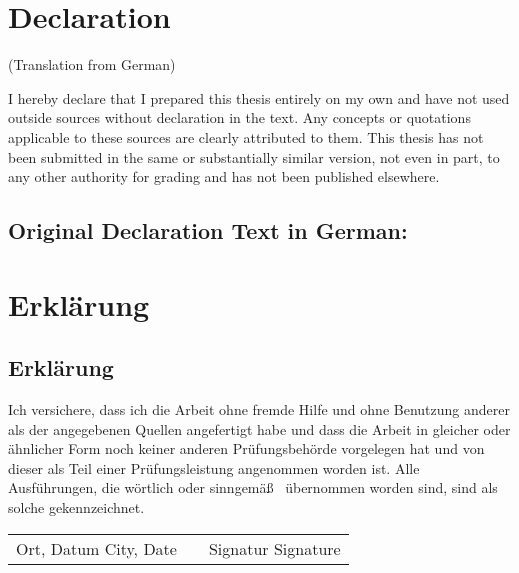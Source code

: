 	
	\ifgerman\else
	\chapter*{Declaration}\vspace{-24pt}
	
	(Translation from German)\bigskip
	
	\noindent I hereby declare that I prepared this thesis entirely on my own and have not used outside sources
	without declaration in the text. Any concepts or quotations applicable to these sources are
	clearly attributed to them. This thesis has not been submitted in the same or substantially similar
	version, not even in part, to any other authority for grading and has not been published elsewhere.

	\section*{Original Declaration Text in German:}

	\fi
	\ifgerman
	\chapter*{Erklärung}
	\else
	\section*{Erklärung}
	\fi
	
	Ich versichere, dass ich die Arbeit ohne fremde Hilfe und ohne Benutzung anderer als der
	angegebenen Quellen angefertigt habe und dass die Arbeit in gleicher oder ähnlicher Form
	noch keiner anderen Prüfungsbehörde vorgelegen hat und von dieser als Teil einer
	Prüfungsleistung angenommen worden ist. Alle Ausführungen, die wörtlich oder sinngemäß~
	übernommen worden sind, sind als solche ge\-kenn\-zeich\-net.
	
	\vspace{40pt}
	
	\begin{center}
		\begin{tabular}{l p{} r}
		  \cline{1-1} \cline{3-3}
		  \begin{minipage}[t]{0.4\textwidth}
		    \centering
			\ifgerman
			Ort, Datum
			\else
			City, Date
			\fi
			\end{minipage}
			&
			\begin{minipage}[t]{0.2\textwidth}
			\end{minipage}
			&
			\begin{minipage}[t]{0.4\textwidth}
			  \centering
			\ifgerman
			Signatur
			\else
			Signature
			\fi
			\end{minipage}
		\end{tabular}
	\end{center}